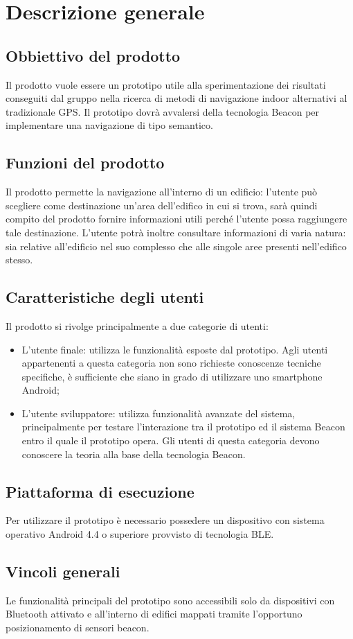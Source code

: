 \documentclass[../AnalisiDeiRequisiti.tex]{subfiles}
\begin{document}
\section{Descrizione generale}
	\subsection{Obbiettivo del prodotto}
	Il prodotto vuole essere un prototipo utile alla sperimentazione dei risultati conseguiti dal gruppo nella ricerca di metodi di navigazione indoor alternativi al tradizionale GPS.
Il prototipo dovrà avvalersi della tecnologia Beacon per implementare una navigazione di tipo semantico.

	\subsection{Funzioni del prodotto}
	Il prodotto permette la navigazione all'interno di un edificio: l'utente può scegliere come destinazione un'area dell'edifico in cui si trova, sarà quindi compito del prodotto fornire informazioni utili perché l'utente possa raggiungere tale destinazione.
L'utente potrà inoltre consultare informazioni di varia natura: sia relative all'edificio nel suo complesso che alle singole aree presenti nell'edifico stesso.
		
	\subsection{Caratteristiche degli utenti} 
	Il prodotto si rivolge principalmente a due categorie di utenti:
	\begin{itemize}
		\item L'utente finale: utilizza le funzionalità esposte dal prototipo. Agli utenti appartenenti a questa categoria non sono richieste conoscenze tecniche specifiche, è sufficiente che siano in grado di utilizzare uno smartphone Android;
		\item L'utente sviluppatore: utilizza funzionalità avanzate del sistema, principalmente per testare l'interazione tra il prototipo ed il sistema Beacon entro il quale il prototipo opera. Gli utenti di questa categoria devono conoscere la teoria alla base della tecnologia Beacon.
	\end{itemize}
	
	\subsection{Piattaforma di esecuzione}
	Per utilizzare il prototipo è necessario possedere un dispositivo con sistema operativo Android 4.4 o superiore provvisto di tecnologia BLE.
	
	\subsection{Vincoli generali}
	Le funzionalità principali del prototipo sono accessibili solo da dispositivi con Bluetooth attivato e all'interno di edifici mappati tramite l'opportuno posizionamento di sensori beacon.
\end{document}
